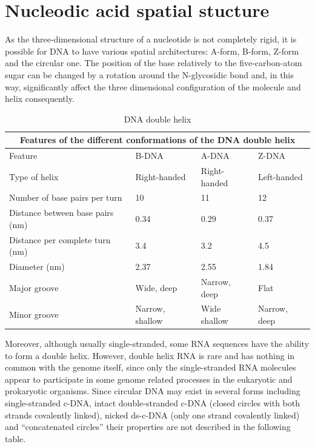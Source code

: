 \section{Nucleodic acid spatial stucture}

As the three-dimensional structure of a nucleotide is not completely rigid, it is possible for DNA to have various spatial architectures: A-form, B-form, Z-form and the circular one. The position of the base relatively to the five-carbon-atom sugar can be changed by a rotation around the N-glycosidic bond and, in this way, significantly affect the three dimensional configuration of the molecule and helix consequently.

\begin{table}[!ht]
	\caption{DNA double helix}\label{t:1}
	\smallskip
	\centering
	
	\begin{tabular}{ |p{3cm}||p{3cm}|p{3cm}|p{3cm}|  }
		\hline
		\multicolumn{4}{|c|}{Features of the different conformations of the DNA double helix} \\
		\hline
		Feature& B-DNA & A-DNA & Z-DNA\\
		\hline
		\hline
		Type of helix & Right-handed & Right-handed & Left-handed\\
		\hline
		Number of base pairs per turn & 10 & 11 & 12\\
		\hline
		Distance between base pairs (nm) & 0.34 & 0.29 & 0.37\\
		\hline
		Distance per complete turn (nm) & 3.4 & 3.2 & 4.5\\
		\hline
		Diameter (nm) & 2.37 & 2.55 & 1.84\\
		\hline
		Major groove & Wide, deep & Narrow, deep & Flat\\
		\hline
		Minor groove & Narrow, shallow & Wide shallow & Narrow, deep\\
		\hline
	\end{tabular}
\end{table}

Moreover, although usually single-stranded, some RNA sequences have the ability to form a double helix. However, double helix RNA is rare and has nothing in common with the genome itself, since only the single-stranded RNA molecules appear to participate in some genome related processes in the eukaryotic and prokaryotic organisms. Since circular DNA may exist in several forms including single-stranded c-DNA, intact double-stranded c-DNA (closed circles with both strands covalently linked), nicked ds-c-DNA (only one strand covalently linked) and “concatenated circles” their properties are not described in the following table.

